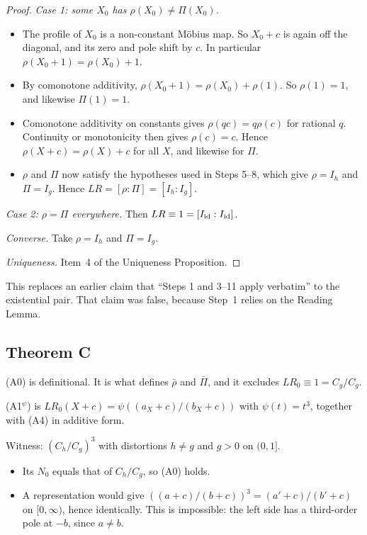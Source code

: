 \begin{proof}
\emph{Case 1: some $X_0$ has $\rho(X_0)\ne\Pi(X_0)$.}
\begin{itemize}
\item The profile of $X_0$ is a non-constant M\"obius map. So $X_0+c$ is again off the diagonal, and its zero and pole shift by $c$. In particular $\rho(X_0+1)=\rho(X_0)+1$.
\item By comonotone additivity, $\rho(X_0+1)=\rho(X_0)+\rho(1)$. So $\rho(1)=1$, and likewise $\Pi(1)=1$.
\item Comonotone additivity on constants gives $\rho(qc)=q\rho(c)$ for rational $q$. Continuity or monotonicity then gives $\rho(c)=c$. Hence $\rho(X+c)=\rho(X)+c$ for all $X$, and likewise for $\Pi$.
\item $\rho$ and $\Pi$ now satisfy the hypotheses used in Steps 5--8, which give $\rho=I_h$ and $\Pi=I_g$. Hence $LR=[\rho:\Pi]=[I_h:I_g]$.
\end{itemize}
\emph{Case 2: $\rho=\Pi$ everywhere.} Then $LR\equiv1=[I_{\rm id}:I_{\rm id}]$.

\emph{Converse.} Take $\rho=I_h$ and $\Pi=I_g$.

\emph{Uniqueness.} Item~4 of the Uniqueness Proposition.
\end{proof}

This replaces an earlier claim that ``Steps 1 and 3--11 apply verbatim'' to the existential pair. That claim was false, because Step~1 relies on the Reading Lemma.

\subsection{Theorem C}

\begin{example}[(A0)]
(A0) is definitional. It is what defines $\bar\rho$ and $\bar\Pi$, and it excludes $LR_0\equiv1=C_g/C_g$.
\end{example}

\begin{example}
(A1$^\psi$) is $LR_0(X+c)=\psi((a_X+c)/(b_X+c))$ with $\psi(t)=t^3$, together with (A4) in additive form.

Witness: $(C_h/C_g)^3$ with distortions $h\ne g$ and $g>0$ on $(0,1]$.
\begin{itemize}
\item Its $N_0$ equals that of $C_h/C_g$, so (A0) holds.
\item A representation would give $((a+c)/(b+c))^3=(a'+c)/(b'+c)$ on $[0,\infty)$, hence identically. This is impossible: the left side has a third-order pole at $-b$, since $a\ne b$.
\end{itemize}
\end{example}


